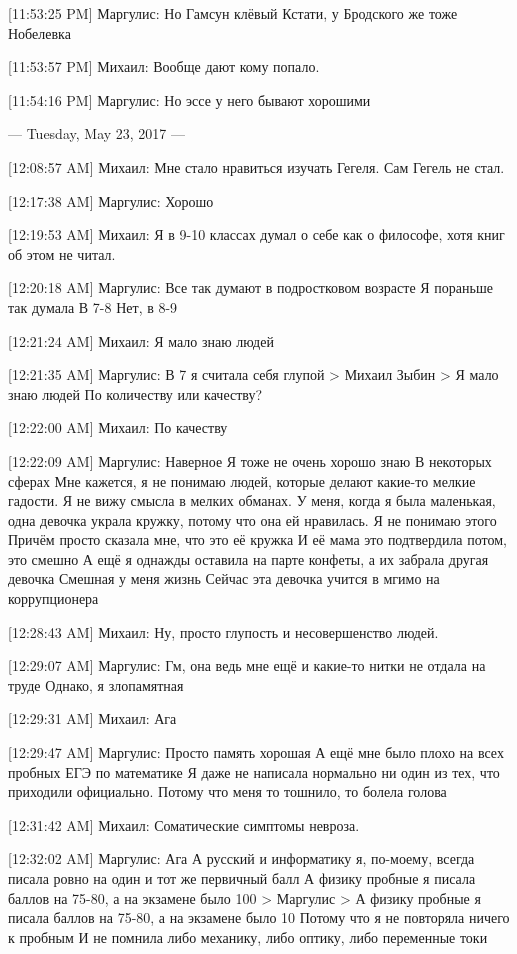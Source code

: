 \documentclass{article}
\begin{document}
{[11:53:25 PM] Маргулис:
Но Гамсун клёвый
 Кстати, у Бродского же тоже Нобелевка

[11:53:57 PM] Михаил:
Вообще дают кому попало.

[11:54:16 PM] Маргулис:
Но эссе у него бывают хорошими

--- Tuesday, May 23, 2017 ---

[12:08:57 AM] Михаил:
Мне стало нравиться изучать Гегеля. Сам Гегель не стал.

[12:17:38 AM] Маргулис:
Хорошо

[12:19:53 AM] Михаил:
Я в 9-10 классах думал о себе как о философе, хотя книг об этом не читал.

[12:20:18 AM] Маргулис:
Все так думают в подростковом возрасте
 Я пораньше так думала
 В 7-8
 Нет, в 8-9

[12:21:24 AM] Михаил:
Я мало знаю людей

[12:21:35 AM] Маргулис:
В 7 я считала себя глупой
> Михаил Зыбин
> Я мало знаю людей
По количеству или качеству?

[12:22:00 AM] Михаил:
По качеству

[12:22:09 AM] Маргулис:
Наверное
 Я тоже не очень хорошо знаю
 В некоторых сферах
 Мне кажется, я не понимаю людей, которые делают какие-то мелкие гадости. Я не вижу смысла в мелких обманах. У меня, когда я была маленькая, одна девочка украла кружку, потому что она ей нравилась. Я не понимаю этого
 Причём просто сказала мне, что это её кружка
 И её мама это подтвердила потом, это смешно
 А ещё я однажды оставила на парте конфеты, а их забрала другая девочка 
Смешная у меня жизнь
 Сейчас эта девочка учится в мгимо на коррупционера

[12:28:43 AM] Михаил:
Ну, просто глупость и несовершенство людей.

[12:29:07 AM] Маргулис:
Гм, она ведь мне ещё и какие-то нитки не отдала на труде
 Однако, я злопамятная

[12:29:31 AM] Михаил:
Ага

[12:29:47 AM] Маргулис:
Просто память хорошая
 А ещё мне было плохо на всех пробных ЕГЭ по математике
 Я даже не написала нормально ни один из тех, что приходили официально.
 Потому что меня то тошнило, то болела голова

[12:31:42 AM] Михаил:
Соматические симптомы невроза.

[12:32:02 AM] Маргулис:
Ага
 А русский и информатику я, по-моему, всегда писала ровно на один и тот же первичный балл
 А физику пробные я писала баллов на 75-80, а на экзамене было 100
> Маргулис
> А физику пробные я писала баллов на 75-80, а на экзамене было 10
Потому что я не повторяла ничего к пробным
 И не помнила либо механику, либо оптику, либо переменные токи

}
\end{document}
